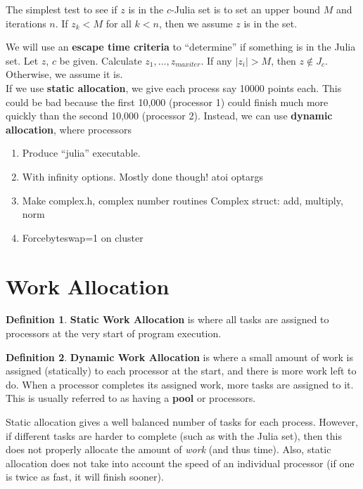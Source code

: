 \documentclass[12pt]{article}
\numberwithin{equation}{section}
\newcommand{\abs}[1]{\lvert#1\rvert} %
\theoremstyle{theorem}
\theoremstyle{definition}
\newtheorem{definition}{Definition}[section]
\theoremstyle{remark}
\begin{document}
The simplest test to see if $z$ is in the $c$-Julia set is to set an upper bound $M$ and iterations $n$.  If $z_k < M$ for all $k < n$, then we assume $z$ is in the set. 

We will use an \textbf{escape time criteria} to ``determine'' if something is in the Julia set.  Let $z$, $c$ be given.  Calculate $z_1, \dots, z_{maxiter}$.  If any $\abs{z_i} > M$, then $z \not\in J_c$.  Otherwise, we assume it is.  \\

If we use \textbf{static allocation}, we give each process say 10000 points each.  This could be bad because the first 10,000 (processor 1) could finish much more quickly than the second 10,000 (processor 2).  Instead, we can use \textbf{dynamic allocation}, where processors 

\begin{enumerate}
\item Produce ``julia'' executable. 
\item With infinity options.  Mostly done though! atoi optargs
\item Make complex.h, complex number routines
\subitem Complex struct: add, multiply, norm
\item Forcebyteswap=1 on cluster
\end{enumerate}

\section{Work Allocation}
\begin{definition} \textbf{Static Work Allocation} is where all tasks are assigned to processors at the very start of program execution. \end{definition}

\begin{definition} \textbf{Dynamic Work Allocation} is where a small amount of work is assigned (statically) to each processor at the start, and there is more work left to do.  When a processor completes its assigned work, more tasks are assigned to it. This is usually referred to as having a \textbf{pool} or processors. \end{definition}

Static allocation gives a well balanced number of tasks for each process.  However, if different tasks are harder to complete (such as with the Julia set), then this does not properly allocate the amount of \textit{work} (and thus time).  Also, static allocation does not take into account the speed of an individual processor (if one is twice as fast, it will finish sooner).
\end{document}
